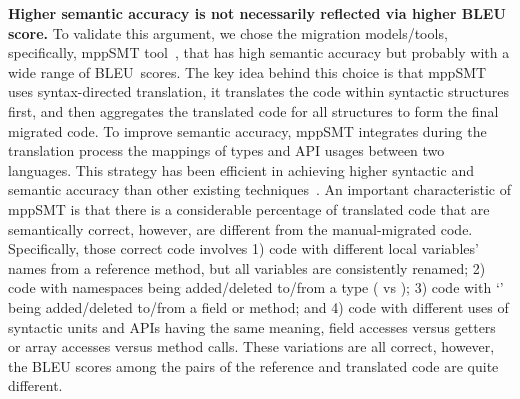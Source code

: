 {\bf Higher semantic accuracy is not necessarily reflected via higher BLEU
  score.}
%
To validate this argument, we chose the migration models/tools,
specifically, mppSMT tool~\cite{ase15}, that has high semantic
accuracy but probably with a wide range of BLEU~scores.
The key idea behind this choice is that mppSMT uses syntax-directed
translation, \ie it translates the code within syntactic structures
first, and then aggregates the translated code for all structures to
form the final migrated code. To improve semantic accuracy, mppSMT
integrates during the translation process the mappings of types and
API usages between two languages. This strategy has been efficient in
achieving higher syntactic and semantic accuracy than other existing
techniques~\cite{ase15}. An important characteristic of mppSMT is that
there is a considerable percentage of translated code that are
semantically correct, however, are different from the manual-migrated
code. Specifically, those correct code involves 1) code with different
local variables' names from a reference method, but all variables are
consistently renamed; 2) code with namespaces being added/deleted
to/from a type (\eg {} vs ); 3) code
with `' being added/deleted to/from a field or method; and
4) code with different uses of syntactic units and APIs having the
same meaning, \eg field accesses versus getters or array accesses
versus method calls. These variations are all correct, however, the
BLEU scores among the pairs of the reference and translated code are
quite different.




%

